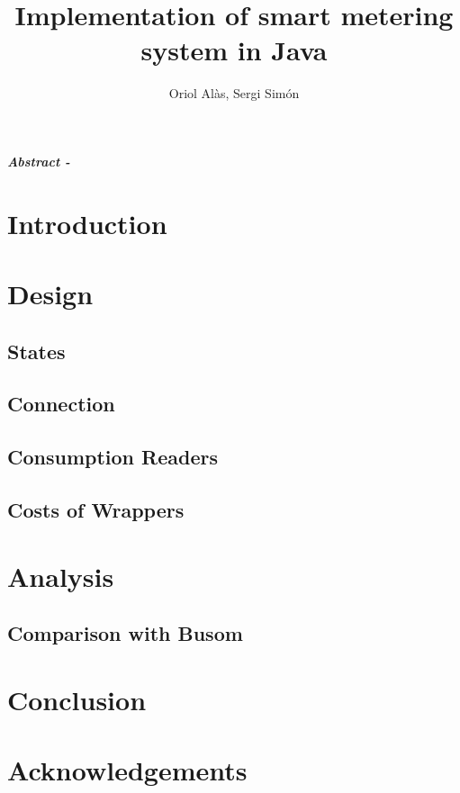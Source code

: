 \documentclass{article}
\title{Implementation of smart metering system in Java}
\author{Oriol Alàs, Sergi Simón}
\begin{document}
   \maketitle
   
   \textbf{\textit{Abstract - }}
   \section{Introduction}
   
   \section{Design}
   
   \subsection{States}
   
   \subsection{Connection}
   
   \subsection{Consumption Readers}
   
   \subsection{Costs of Wrappers}
   
   \label{wrapp:sec}
   \section{Analysis}
   
   \subsection{Comparison with Busom}
   
   \section{Conclusion}
   
   \section{Acknowledgements}
   
   
   
\end{document}
